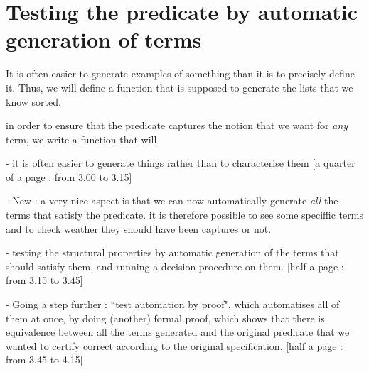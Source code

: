 \section{Testing the predicate by automatic generation of terms}

\label{sect:testingInside}


It is often easier to generate examples of something than it is to precisely define it. Thus, we will define a function that is supposed to generate the lists that we know sorted. 



in order to ensure that the predicate captures the notion that we want for \emph{any} term, we write a function that will 




- it is often easier to generate things rather than to characterise them 
[a quarter of a page : from 3.00 to 3.15]

- New : a very nice aspect is that we can now automatically generate \emph{all} the terms that satisfy the predicate. it is therefore possible to see some speciffic terms and to check weather they should have been captures or not.

- testing the structural properties by automatic generation of the terms that should satisfy them, and running a decision procedure on them.
[half a page : from 3.15 to 3.45]

- Going a step further : ``test automation by proof", which automatises all of them at once, by doing (another) formal proof, which shows that there is equivalence between all the terms generated and the original predicate that we wanted to certify correct according to the original specification.
[half a page : from 3.45 to 4.15]